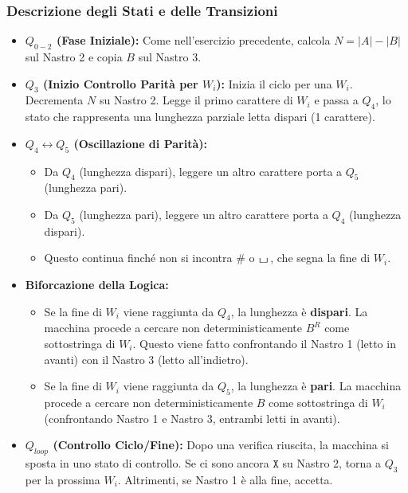 \documentclass[a4paper]{article}
\theoremstyle{definition} %
\newcommand{\blankS}{\ensuremath{\raisebox{-0.15ex}{\scalebox{1.3}[0.7]{$\sqcup$}}\mkern2mu}}
\newcommand{\B}{\blankS} %
\newcommand{\Sh}{\texttt{\#}} %
\newcommand{\X}{\texttt{X}} %
\begin{document}
\subsubsection{Descrizione degli Stati e delle Transizioni}
\begin{itemize}
    \item \textbf{$Q_{0-2}$ (Fase Iniziale):} Come nell'esercizio precedente, calcola $N=|A|-|B|$ sul Nastro 2 e copia $B$ sul Nastro 3.
    \item \textbf{$Q_3$ (Inizio Controllo Parità per $W_i$):} Inizia il ciclo per una $W_i$. Decrementa $N$ su Nastro 2. Legge il primo carattere di $W_i$ e passa a $Q_4$, lo stato che rappresenta una lunghezza parziale letta dispari (1 carattere).
    \item \textbf{$Q_4 \leftrightarrow Q_5$ (Oscillazione di Parità):}
        \begin{itemize}
            \item Da $Q_4$ (lunghezza dispari), leggere un altro carattere porta a $Q_5$ (lunghezza pari).
            \item Da $Q_5$ (lunghezza pari), leggere un altro carattere porta a $Q_4$ (lunghezza dispari).
            \item Questo continua finché non si incontra $\Sh$ o $\B$, che segna la fine di $W_i$.
        \end{itemize}
    \item \textbf{Biforcazione della Logica:}
        \begin{itemize}
            \item Se la fine di $W_i$ viene raggiunta da $Q_4$, la lunghezza è \textbf{dispari}. La macchina procede a cercare non deterministicamente $B^R$ come sottostringa di $W_i$. Questo viene fatto confrontando il Nastro 1 (letto in avanti) con il Nastro 3 (letto all'indietro).
            \item Se la fine di $W_i$ viene raggiunta da $Q_5$, la lunghezza è \textbf{pari}. La macchina procede a cercare non deterministicamente $B$ come sottostringa di $W_i$ (confrontando Nastro 1 e Nastro 3, entrambi letti in avanti).
        \end{itemize}
    \item \textbf{$Q_{loop}$ (Controllo Ciclo/Fine):} Dopo una verifica riuscita, la macchina si sposta in uno stato di controllo. Se ci sono ancora $\X$ su Nastro 2, torna a $Q_3$ per la prossima $W_i$. Altrimenti, se Nastro 1 è alla fine, accetta.
\end{itemize}
\end{document}

